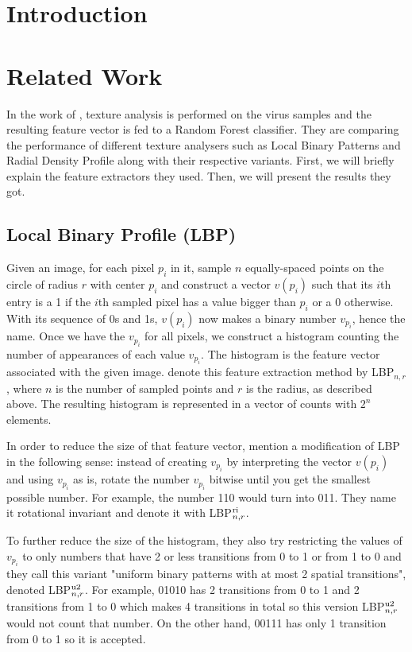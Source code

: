 \begin{multicols}{2}
\section{Introduction}
\section{Related Work}
In the work of \citet{kylberg2011virus}, texture analysis is performed on the virus samples and the resulting feature vector is fed to a Random Forest classifier. They are comparing the performance of different texture analysers such as Local Binary Patterns and Radial Density Profile along with their respective variants. First, we will briefly explain the feature extractors they used. Then, we will present the results they got. 
\subsection{Local Binary Profile (LBP)}
Given an image, for each pixel $p_i$ in it, sample $n$ equally-spaced points on the circle of radius $r$ with center $p_i$ and construct a vector $v(p_i)$ such that its $i$th entry is a 1 if the $i$th sampled pixel has a value bigger than $p_i$ or a 0 otherwise. With its sequence of 0s and 1s, $v(p_i)$ now makes a binary number $v_{p_i}$, hence the name. Once we have the $v_{p_i}$ for all pixels, we construct a histogram counting the number of appearances of each value $v_{p_i}$. The histogram is the feature vector associated with the given image. \citet{kylberg2011virus} denote this feature extraction method by LBP$_{n, r}$, where $n$ is the number of sampled points and $r$ is the radius, as described above. The resulting histogram is represented in a vector of counts with $2^n$ elements. 
\par In order to reduce the size of that feature vector, \citet{kylberg2011virus} mention a modification of LBP in the following sense: instead of creating $v_{p_i}$ by interpreting the vector $v(p_i)$ and using $v_{p_i}$ as is, rotate the number $v_{p_i}$ bitwise until you get the smallest possible number. For example, the number 110 would turn into 011. They name it rotational invariant and denote it with LBP$^{\textnormal{ri}}_{n,r}$.
\par To further reduce the size of the histogram, they also try restricting the values of $v_{p_i}$ to only numbers that have 2 or less transitions from 0 to 1 or from 1 to 0 and they call this variant "uniform binary patterns with at most 2 spatial transitions", denoted LBP$^{\textnormal{u2}}_{n,r}$. For example, 01010 has 2 transitions from 0 to 1 and 2 transitions from 1 to 0 which makes 4 transitions in total so this version LBP$^{\textnormal{u2}}_{n,r}$ would not count that number. On the other hand, 00111 has only 1 transition from 0 to 1 so it is accepted. 

\newpage


\end{multicols}

